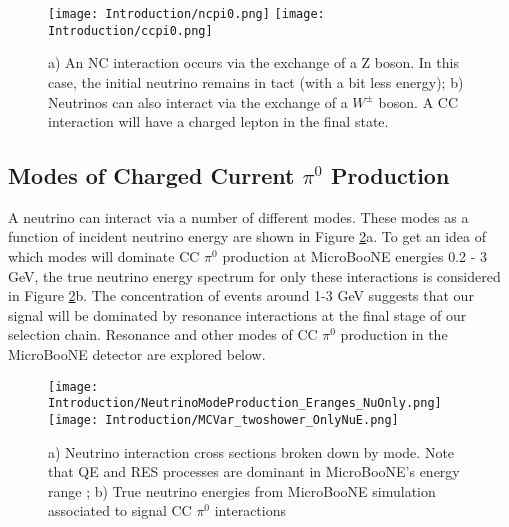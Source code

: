 \begin{figure}[H]
\centering
\texttt{[image: Introduction/ncpi0.png]}
\hspace{3 mm}
\texttt{[image: Introduction/ccpi0.png]}
\caption{a) An NC interaction occurs via the exchange of a Z boson. In this case, the initial neutrino remains in tact (with a bit less energy); b) Neutrinos can also interact via the exchange of a $W^\pm$ boson. A CC interaction will have a charged lepton in the final state. } 
\label{fig:CCNC}
\end{figure}




\subsection{ Modes of Charged Current $\pi^0$ Production}
A neutrino can interact via a number of different modes. These modes as a function of incident neutrino energy are shown in Figure \ref{fig:numodes}a. To get an idea of which modes will dominate CC $\pi^0$ production at MicroBooNE energies 0.2 - 3 GeV, the true neutrino energy spectrum for only these interactions is considered in Figure \ref{fig:numodes}b. The concentration of events around 1-3 GeV suggests that our signal will be dominated by resonance interactions at the final stage of our selection chain. Resonance and other modes of CC $\pi^0$ production in the MicroBooNE detector are explored below.

\begin{figure}[h!]
\centering
\texttt{[image: Introduction/NeutrinoModeProduction\_Eranges\_NuOnly.png]}
\hspace{2mm}
\texttt{[image: Introduction/MCVar\_twoshower\_OnlyNuE.png]}
\caption{ a) Neutrino interaction cross sections broken down by mode. Note that QE and RES processes are dominant in MicroBooNE's energy range \cite{bib:gzeller}; b) True neutrino energies from MicroBooNE simulation associated to signal CC $\pi^0$ interactions  }
\label{fig:numodes}
\end{figure}

